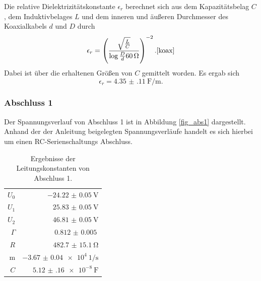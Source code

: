 Die relative Dielektrizitätskonstante $\epsilon_r$ berechnet sich aus dem Kapazitätsbelag $C$, dem Induktivbelages $L$ und dem inneren und äußeren Durchmesser des Koaxialkabels $d$ und $D$ durch
\begin{equation*}
	\epsilon_r = \left(\frac{\sqrt{\frac{L}{C}}}{\log{\frac{D}{d}} \SI{60}{\ohm}}\right)^{-2}. \text{\cite{koax}}
\end{equation*}
Dabei ist über die erhaltenen Größen von $C$ gemittelt worden.
Es ergab sich
\begin{equation*}
	\epsilon_r = \SI{4.35(11)}{\farad\per\meter}.
\end{equation*}

\subsubsection{Abschluss 1} %
\label{sub:abschluss_1}

Der Spannungsverlauf von Abschluss 1 ist in Abbildung \ref{fig_abs1} dargestellt.
Anhand der der Anleitung beigelegten Spannungsverläufe handelt es sich hierbei um einen RC-Serien\-schaltungs Abschluss.


\begin{table}
\centering
	\caption[]{Ergebnisse der Leitungskonstanten von Abschluss 1.}
	\begin{tabular}{r|r}
	\toprule
		$U_0$    & $\SI{-24.22(5)}{\volt}$\\
		$U_1$    & $\SI{25.83(5)}{\volt}$\\
		$U_2$    & $\SI{46.81(5)}{\volt}$\\
		$\Gamma$ & $\SI{0.812(5)}{}$\\
		$R$    & $\SI{482.7(151)}{\ohm}$\\
		m      & $\SI{-3.67(4)e4}{1\per\second}$\\
		$C$    & $\SI{5.12(16)e-8}{\farad}$\\
		\bottomrule
	\end{tabular}
\end{table}

